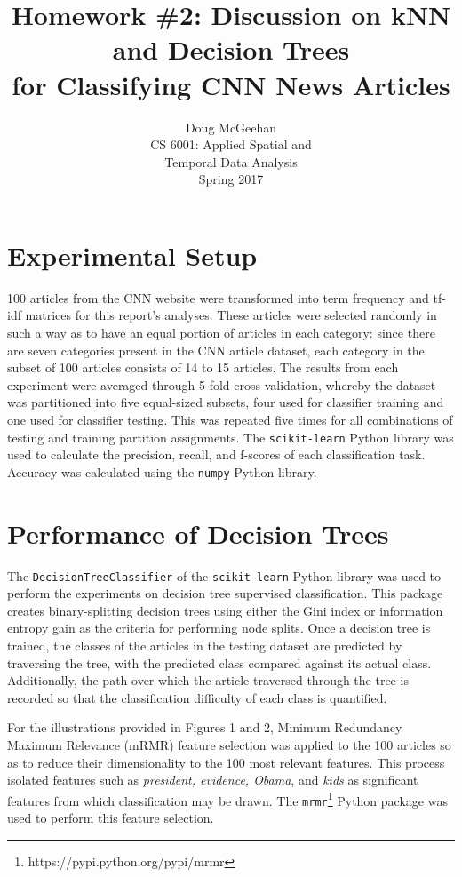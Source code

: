 \documentclass[11pt]{article}
\title{Homework \#2: Discussion on kNN and Decision Trees\\ for Classifying CNN News Articles}
\author{Doug McGeehan\\
		CS 6001: Applied Spatial and \\ Temporal Data Analysis\\
		Spring 2017}
\begin{document}
\maketitle

\section{Experimental Setup}

100 articles from the CNN website were transformed into term frequency and tf-idf matrices for this report's analyses.
These articles were selected randomly in such a way as to have an equal portion of articles in each category: since there are seven categories present in the CNN article dataset, each category in the subset of 100 articles consists of 14 to 15 articles.
The results from each experiment were averaged through 5-fold cross validation,
 whereby the dataset was partitioned into five equal-sized subsets, four used for classifier training and one used for classifier testing.
This was repeated five times for all combinations of testing and training partition assignments.
The \texttt{scikit-learn} Python library was used to calculate the precision, recall, and f-scores of each classification task.
Accuracy was calculated using the \texttt{numpy} Python library.

\section{Performance of Decision Trees} \label{sec:tree}

The \texttt{DecisionTreeClassifier} of the \texttt{scikit-learn} Python library was used to perform the experiments on decision tree supervised classification.
This package creates binary-splitting decision trees using either the Gini index or information entropy gain as the criteria for performing node splits.
Once a decision tree is trained, the classes of the articles in the testing dataset are predicted by traversing the tree, with the predicted class compared against its actual class.
Additionally, the path over which the article traversed through the tree is recorded so that the classification difficulty of each class is quantified.

For the illustrations provided in Figures 1 and 2, Minimum Redundancy Maximum Relevance (mRMR) feature selection was applied to the 100 articles so as to reduce their dimensionality to the 100 most relevant features.
This process isolated features such as \emph{president, evidence, Obama}, and \emph{kids} as significant features from which classification may be drawn.
The \texttt{mrmr}\footnote{https://pypi.python.org/pypi/mrmr} Python package was used to perform this feature selection.
\end{document}

